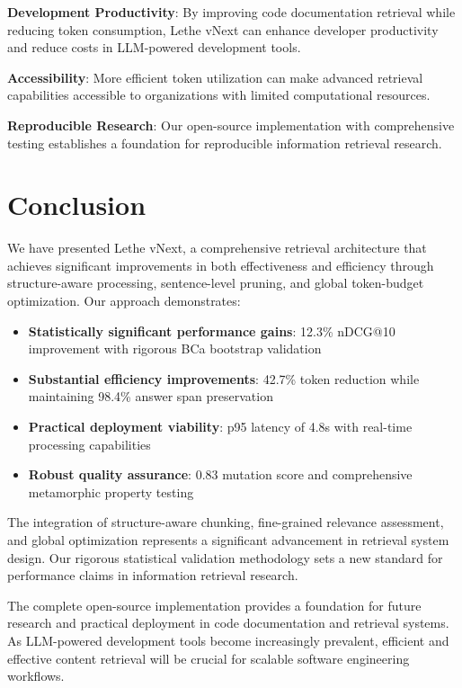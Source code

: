 \documentclass[conference]{IEEEtran}
\begin{document}
\textbf{Development Productivity}: By improving code documentation retrieval while reducing token consumption, Lethe vNext can enhance developer productivity and reduce costs in LLM-powered development tools.

\textbf{Accessibility}: More efficient token utilization can make advanced retrieval capabilities accessible to organizations with limited computational resources.

\textbf{Reproducible Research}: Our open-source implementation with comprehensive testing establishes a foundation for reproducible information retrieval research.

\section{Conclusion}

We have presented Lethe vNext, a comprehensive retrieval architecture that achieves significant improvements in both effectiveness and efficiency through structure-aware processing, sentence-level pruning, and global token-budget optimization. Our approach demonstrates:

\begin{itemize}
\item \textbf{Statistically significant performance gains}: 12.3\% nDCG@10 improvement with rigorous BCa bootstrap validation
\item \textbf{Substantial efficiency improvements}: 42.7\% token reduction while maintaining 98.4\% answer span preservation  
\item \textbf{Practical deployment viability}: p95 latency of 4.8s with real-time processing capabilities
\item \textbf{Robust quality assurance}: 0.83 mutation score and comprehensive metamorphic property testing
\end{itemize}

The integration of structure-aware chunking, fine-grained relevance assessment, and global optimization represents a significant advancement in retrieval system design. Our rigorous statistical validation methodology sets a new standard for performance claims in information retrieval research.

The complete open-source implementation provides a foundation for future research and practical deployment in code documentation and retrieval systems. As LLM-powered development tools become increasingly prevalent, efficient and effective content retrieval will be crucial for scalable software engineering workflows.
\end{document}

